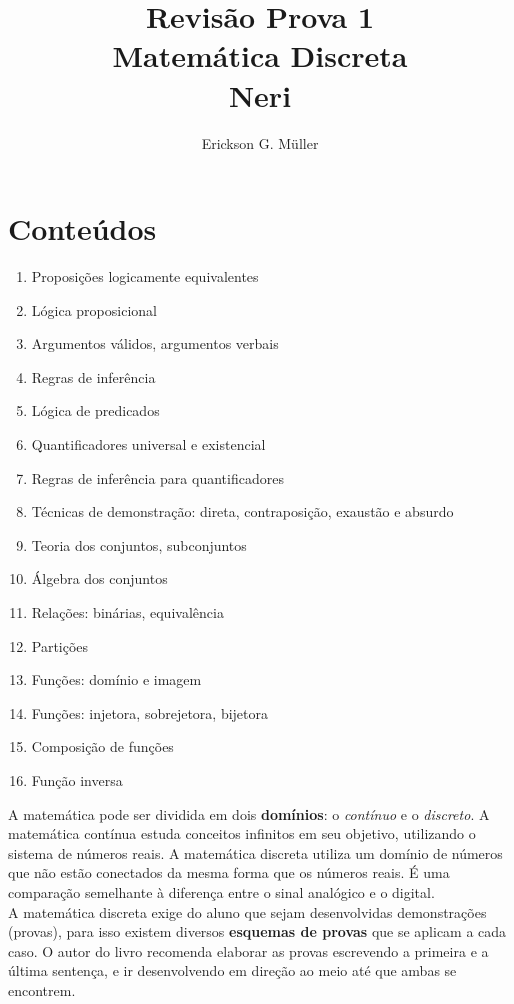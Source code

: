 \documentclass[•]{article}
\title{Revisão Prova 1\\Matemática Discreta\\Neri}
\author{Erickson G. Müller}
\begin{document}
	\maketitle
	\section{Conteúdos}
		\begin{enumerate}
			\item Proposições logicamente equivalentes
			\item Lógica proposicional
			\item Argumentos válidos, argumentos verbais
			\item Regras de inferência
			\item Lógica de predicados
			\item Quantificadores universal e existencial
			\item Regras de inferência para quantificadores
			\item Técnicas de demonstração: direta, contraposição, exaustão e absurdo
			\item Teoria dos conjuntos, subconjuntos
			\item Álgebra dos conjuntos
			\item Relações: binárias, equivalência
			\item Partições
			\item Funções: domínio e imagem
			\item Funções: injetora, sobrejetora, bijetora
			\item Composição de funções
			\item Função inversa
		\end{enumerate}
	\newpage
	A matemática pode ser dividida em dois \textbf{domínios}: o \textit{contínuo} e o \textit{discreto}. A matemática contínua estuda conceitos infinitos em seu objetivo, utilizando o sistema de números reais. A matemática discreta utiliza um domínio de números que não estão conectados da mesma forma que os números reais. É uma comparação semelhante à diferença entre o sinal analógico e o digital.\\
	
	A matemática discreta exige do aluno que sejam desenvolvidas demonstrações (provas), para isso existem diversos \textbf{esquemas de provas} que se aplicam a cada caso. O autor do livro recomenda elaborar as provas escrevendo a primeira e a última sentença, e ir desenvolvendo em direção ao meio até que ambas se encontrem.\\
	
	
\end{document}
